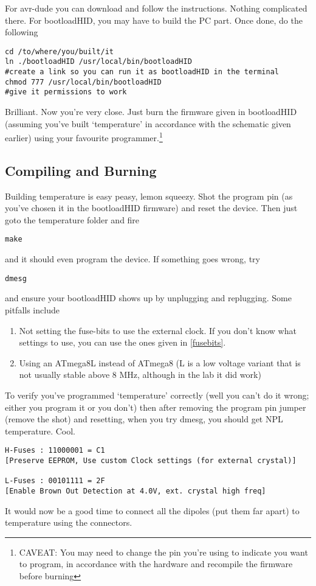 		For avr-dude you can download and follow the instructions. Nothing complicated there. For bootloadHID, you may have to build the PC part. Once done, do the following
		\begin{lstlisting}
cd /to/where/you/built/it
ln ./bootloadHID /usr/local/bin/bootloadHID
#create a link so you can run it as bootloadHID in the terminal
chmod 777 /usr/local/bin/bootloadHID
#give it permissions to work
		\end{lstlisting}
		Brilliant. Now you're very close. Just burn the firmware given in bootloadHID (assuming you've built `temperature' in accordance with the schematic given earlier) using your favourite programmer.\footnote{CAVEAT: You may need to change the pin you're using to indicate you want to program, in accordance with the hardware and recompile the firmware before burning}
	\subsection{Compiling and Burning}
		Building temperature is easy peasy, lemon squeezy. Shot the program pin (as you've chosen it in the bootloadHID firmware) and reset the device. Then just goto the temperature folder and fire
		\begin{lstlisting}
make
		\end{lstlisting}
		and it should even program the device. If something goes wrong, try
		\begin{lstlisting}
dmesg
		\end{lstlisting}
		and ensure your bootloadHID shows up by unplugging and replugging. Some pitfalls include
		\begin{enumerate}
			\item Not setting the fuse-bits to use the external clock. If you don't know what settings to use, you can use the ones given in \autoref{fusebits}.
			\item Using an ATmega8L instead of ATmega8 (L is a low voltage variant that is not usually stable above 8 MHz, although in the lab it did work)
		\end{enumerate}
		To verify you've programmed `temperature' correctly (well you can't do it wrong; either you program it or you don't) then after removing the program pin jumper (remove the shot) and resetting, when you try dmesg, you should get NPL temperature. Cool.
		\begin{lstlisting}
H-Fuses	: 11000001 = C1 
[Preserve EEPROM, Use custom Clock settings (for external crystal)]

L-Fuses	: 00101111 = 2F 
[Enable Brown Out Detection at 4.0V, ext. crystal high freq]
		\end{lstlisting}\label{fusebits}
		\par
		It would now be a good time to connect all the dipoles (put them far apart) to temperature using the connectors.

